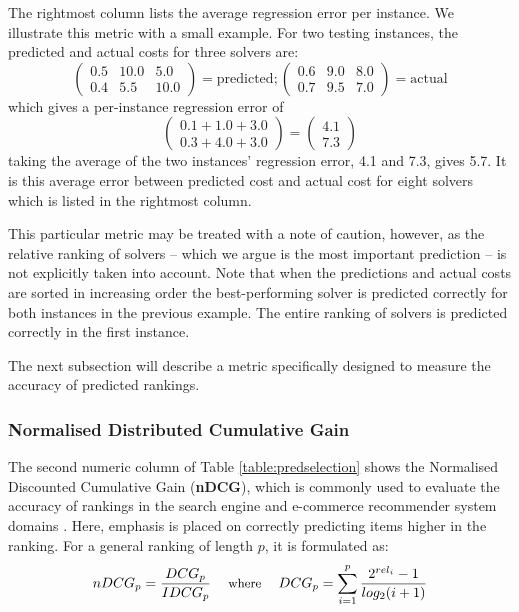 The rightmost column lists the average regression error per instance. 
We illustrate this metric with a small example. For two testing instances, the predicted and actual costs for three solvers are: 
\[ \left( \begin{array}{ccc}
0.5 & 10.0 & 5.0 \\
0.4 & 5.5 & 10.0  \end{array} \right) = \text{predicted};
\left( \begin{array}{ccc}
0.6 & 9.0 & 8.0 \\
0.7 & 9.5 & 7.0 \end{array} \right) = \text{actual}\]
which gives a per-instance regression error of
\[ \left( \begin{array}{c}
0.1 + 1.0 + 3.0 \\
0.3 + 4.0 + 3.0
\end{array}  \right) = 
\left( \begin{array}{c}
4.1 \\
7.3
\end{array}  \right) \] 
taking the average of the two instances' regression error, 4.1 and 7.3, gives 5.7.
It is this average error between predicted cost and actual cost for eight solvers which is listed in the rightmost column.

This particular metric may be treated with a note of caution, however, as the relative ranking of solvers -- which we argue is the most important prediction -- is not explicitly taken into account.
Note that when the predictions and actual costs are sorted in increasing order the best-performing solver is predicted correctly for both instances in the previous example.
The entire ranking of solvers is predicted correctly in the first instance.

The next subsection will describe a metric specifically designed to measure the accuracy of predicted rankings.  
 
\subsubsection{Normalised Distributed Cumulative Gain}

\label{sub:ndcg}

The second numeric column of Table \ref{table:predselection} shows the 
Normalised Discounted Cumulative Gain (\textbf{nDCG}), which is commonly used to evaluate the accuracy of rankings in the search engine and e-commerce recommender system domains \cite{NDCG}. 
Here, emphasis is placed on correctly predicting items higher in the ranking. For a general ranking of length $p$, it is formulated as:
\begin{equation}
\small
nDCG_p = \frac{DCG_p}{IDCG_p}
\quad\text{ where }\quad
DCG_p = \sum_{i=1}^{p} \frac{2^{rel_i} - 1}{log_2(i+1)}
\label{eq:ndcg}
\end{equation}


